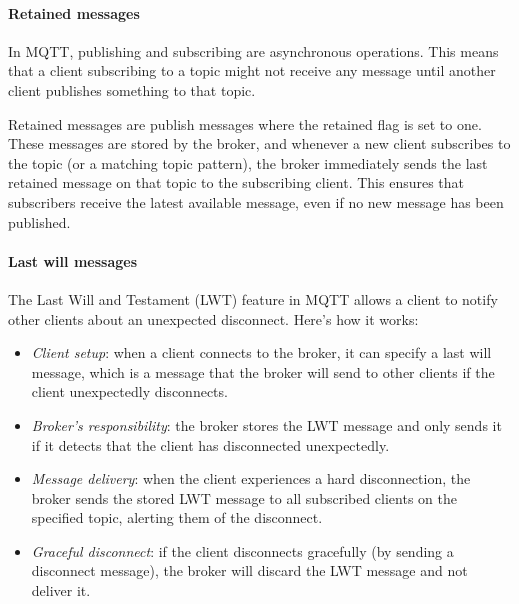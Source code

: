\paragraph*{Retained messages} 
In MQTT, publishing and subscribing are asynchronous operations. 
This means that a client subscribing to a topic might not receive any message until another client publishes something to that topic.

Retained messages are publish messages where the retained flag is set to one. 
These messages are stored by the broker, and whenever a new client subscribes to the topic (or a matching topic pattern), the broker immediately sends the last retained message on that topic to the subscribing client. 
This ensures that subscribers receive the latest available message, even if no new message has been published.

\paragraph*{Last will messages}
The Last Will and Testament (LWT) feature in MQTT allows a client to notify other clients about an unexpected disconnect. 
Here's how it works:
\begin{itemize}
    \item \textit{Client setup}: when a client connects to the broker, it can specify a last will message, which is a message that the broker will send to other clients if the client unexpectedly disconnects.
    \item \textit{Broker's responsibility}: the broker stores the LWT message and only sends it if it detects that the client has disconnected unexpectedly.
    \item \textit{Message delivery}: when the client experiences a hard disconnection, the broker sends the stored LWT message to all subscribed clients on the specified topic, alerting them of the disconnect.
    \item \textit{Graceful disconnect}: if the client disconnects gracefully (by sending a disconnect message), the broker will discard the LWT message and not deliver it.
\end{itemize}

